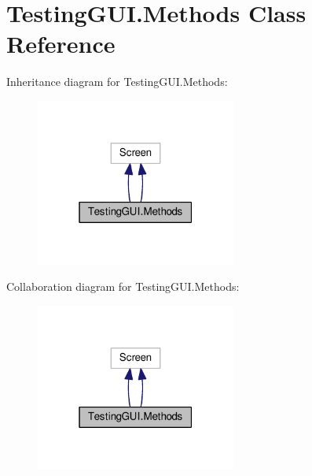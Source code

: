 \hypertarget{classTestingGUI_1_1Methods}{}\section{Testing\+G\+U\+I.\+Methods Class Reference}
\label{classTestingGUI_1_1Methods}


Inheritance diagram for Testing\+G\+U\+I.\+Methods\+:\nopagebreak
\begin{figure}[H]
\begin{center}
\leavevmode
\includegraphics[width=187pt]{classTestingGUI_1_1Methods__inherit__graph}
\end{center}
\end{figure}


Collaboration diagram for Testing\+G\+U\+I.\+Methods\+:\nopagebreak
\begin{figure}[H]
\begin{center}
\leavevmode
\includegraphics[width=187pt]{classTestingGUI_1_1Methods__coll__graph}
\end{center}
\end{figure}

